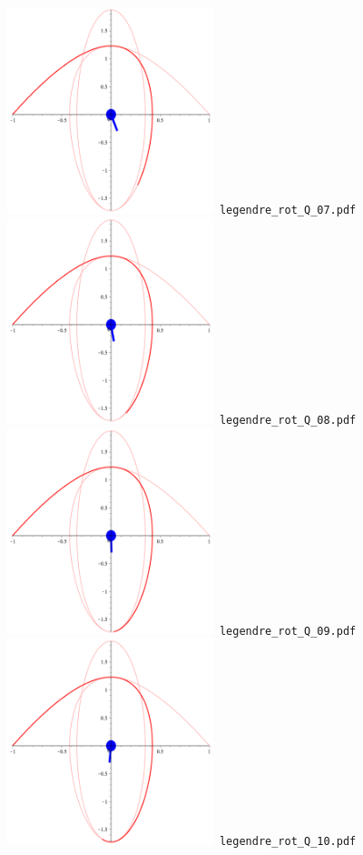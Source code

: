 \documentclass[a4paper]{amsart}
\begin{document}
\includegraphics[width=6cm]{legendre_rot_Q_07.pdf}\verb+ legendre_rot_Q_07.pdf+\\
\includegraphics[width=6cm]{legendre_rot_Q_08.pdf}\verb+ legendre_rot_Q_08.pdf+\\
\includegraphics[width=6cm]{legendre_rot_Q_09.pdf}\verb+ legendre_rot_Q_09.pdf+\\
\includegraphics[width=6cm]{legendre_rot_Q_10.pdf}\verb+ legendre_rot_Q_10.pdf+\\
\end{document}
